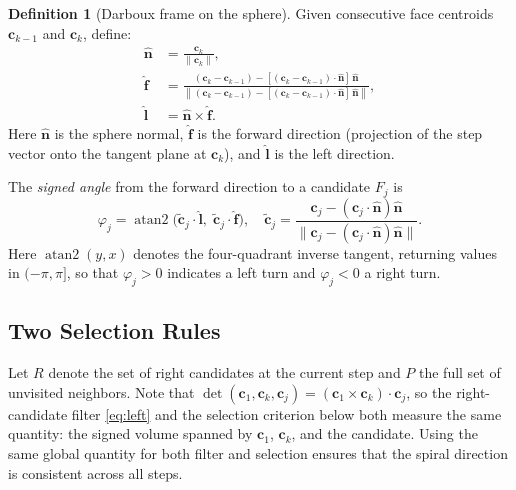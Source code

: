\documentclass[12pt]{article}
\theoremstyle{definition}
\newtheorem{defn}{Definition}[section]
\begin{document}
\begin{defn}[Darboux frame on the sphere]
\label{def:darboux}
Given consecutive face centroids $\mathbf{c}_{k-1}$ and $\mathbf{c}_k$,
define:
\begin{align}
  \hat{\mathbf{n}} &= \frac{\mathbf{c}_k}{\|\mathbf{c}_k\|},
  \label{eq:nhat}\\
 \hat{\mathbf{f}} &= \frac{
               (\mathbf{c}_k - \mathbf{c}_{k-1})
               - [(\mathbf{c}_k - \mathbf{c}_{k-1})\cdot\hat{\mathbf{n}}]\,\hat{\mathbf{n}}}{\left\|
               (\mathbf{c}_k - \mathbf{c}_{k-1})
               - [(\mathbf{c}_k - \mathbf{c}_{k-1})\cdot\hat{\mathbf{n}}]\,\hat{\mathbf{n}}
             \right\|},
  \label{eq:fhat}\\
  \hat{\mathbf{l}} &= \hat{\mathbf{n}} \times \hat{\mathbf{f}}.
  \label{eq:lhat}
\end{align}
Here $\hat{\mathbf{n}}$ is the sphere normal, $\hat{\mathbf{f}}$ is the forward direction
(projection of the step vector onto the tangent plane at $\mathbf{c}_k$),
and $\hat{\mathbf{l}}$ is the left direction.
\end{defn}

The \emph{signed angle} from the forward direction to a candidate $F_j$ is
\begin{equation}
  \varphi_j = \operatorname{atan2}\!\bigl(
    \tilde{\mathbf{c}}_j \cdot \hat{\mathbf{l}},\;
    \tilde{\mathbf{c}}_j \cdot \hat{\mathbf{f}}
  \bigr),
  \quad
  \tilde{\mathbf{c}}_j
    = \frac{\mathbf{c}_j - (\mathbf{c}_j\cdot\hat{\mathbf{n}})\hat{\mathbf{n}}}
           {\|\mathbf{c}_j - (\mathbf{c}_j\cdot\hat{\mathbf{n}})\hat{\mathbf{n}}\|}.
  \label{eq:phi}
\end{equation}
Here $\operatorname{atan2}(y,x)$ denotes the four-quadrant inverse tangent,
returning values in $(-\pi,\pi]$, so that $\varphi_j>0$ indicates a left turn
and $\varphi_j<0$ a right turn.

\subsection{Two Selection Rules}
\label{sec:rules}

Let $R$ denote the set of right candidates at the current step
and $P$ the full set of unvisited neighbors.
Note that $\det(\mathbf{c}_1,\mathbf{c}_k,\mathbf{c}_j)
= (\mathbf{c}_1\times\mathbf{c}_k)\cdot\mathbf{c}_j$,
so the right-candidate filter \eqref{eq:left} and the selection criterion below
both measure the same quantity: the signed volume spanned by
$\mathbf{c}_1$, $\mathbf{c}_k$, and the candidate.
Using the same global quantity for both filter and selection ensures
that the spiral direction is consistent across all steps.
\end{document}
